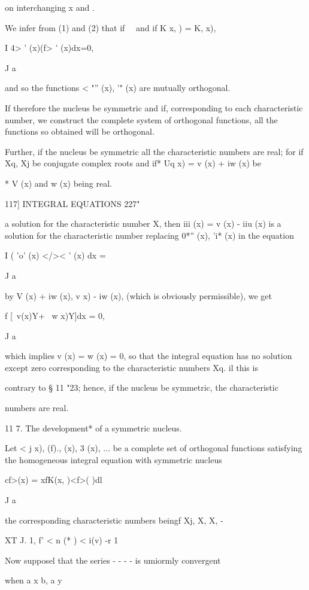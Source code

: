 {on interchanging x and .

We infer from (1) and (2) that if \ \ and if K x, ) = K, x),

I 4> ' (x)(f> ' (x)dx=0,

J a

and so the functions < "'' (x), '" (x) are mutually orthogonal.

If therefore the nucleus be symmetric and if, corresponding to each
characteristic number, we construct the complete system of orthogonal
functions, all the functions so obtained will be orthogonal.

Further, if the nucleus be symmetric all the characteristic numbers
are real; for if Xq, Xj be conjugate complex roots and if* Uq x) = v
(x) + iw (x) be

* V (x) and w (x) being real.

117] INTEGRAL EQUATIONS 227"

a solution for the characteristic number X, then iii (x) = v (x) -
iiu (x) is a solution for the characteristic number \; replacing 0*''
(x), 'i* (x) in the equation

I ( 'o' (x) </>< ' (x) dx =

J a

by V (x) + iw (x), v x) - iw (x), (which is obviously permissible), we
get

f [\ v(x)Y+ \ w x)Y]dx = 0,

J a

which implies v (x) = w (x) = 0, so that the integral equation has no
solution except zero corresponding to the characteristic numbers Xq.
il this is

contrary to § 11 "23; hence, if the nucleus be symmetric, the
characteristic

numbers are real.

11 7. The development* of a symmetric nucleus.

Let < j x), (f)., (x), 3 (x), ... be a complete set of orthogonal
functions satisfying the homogeneous integral equation with symmetric
nucleus

cf>(x) = xfK(x, )<f>( )dl

J a

the corresponding characteristic numbers beingf Xj, X, X, -

XT J. 1, f' < n (* ) < i(v)  -r 1

Now supposel that the series - - - - is umiormly convergent

when a x b, a y %

}
